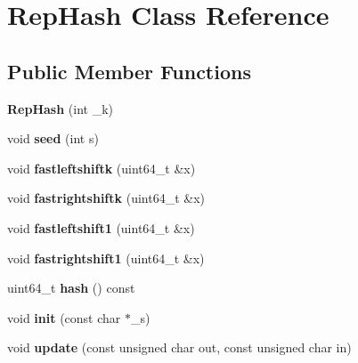 \hypertarget{classRepHash}{}\section{Rep\+Hash Class Reference}
\label{classRepHash}
\subsection*{Public Member Functions}
\begin{DoxyCompactItemize}
\item 
\mbox{\label{classRepHash_a25e8e5d5c207daaf3d400c14dea6f1a3}} 
{\bfseries Rep\+Hash} (int \+\_\+k)
\item 
\mbox{\label{classRepHash_a033234d4bef66ec18533abe46b9ccd16}} 
void {\bfseries seed} (int s)
\item 
\mbox{\label{classRepHash_a861c6881360a65338cb239377bca99fb}} 
void {\bfseries fastleftshiftk} (uint64\+\_\+t \&x)
\item 
\mbox{\label{classRepHash_a6c24ad52ac69b2eb79ad16d0259b18dd}} 
void {\bfseries fastrightshiftk} (uint64\+\_\+t \&x)
\item 
\mbox{\label{classRepHash_ac4b468af3c2a34a6f0b9214c4b439cc6}} 
void {\bfseries fastleftshift1} (uint64\+\_\+t \&x)
\item 
\mbox{\label{classRepHash_ab024299697638d33c8c2a780feb70007}} 
void {\bfseries fastrightshift1} (uint64\+\_\+t \&x)
\item 
\mbox{\label{classRepHash_a80bfa41a0ab024e53e680258d747836f}} 
uint64\+\_\+t {\bfseries hash} () const
\item 
\mbox{\label{classRepHash_a29bb07d24acd80667d220544f2482233}} 
void {\bfseries init} (const char $\ast$\+\_\+s)
\item 
\mbox{\label{classRepHash_ab63b4c62fce888d77ffdcf11ce88b1ba}} 
void {\bfseries update} (const unsigned char out, const unsigned char in)
\item 
\mbox{\label{classRepHash_afb65dd60942ad8db5cbe8612ad3efce2}} 

\end{DoxyCompactItemize}
